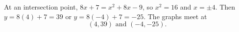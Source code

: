 At an intersection point, $8x+7=x^2+8x-9$, so $x^2=16$ and $x=\pm4$. Then $y=8(4)+7=39$ or $y=8(-4)+7=-25$. The graphs meet at
\[\boxed{(4,39)\text{ and }(-4,-25)}.\]
